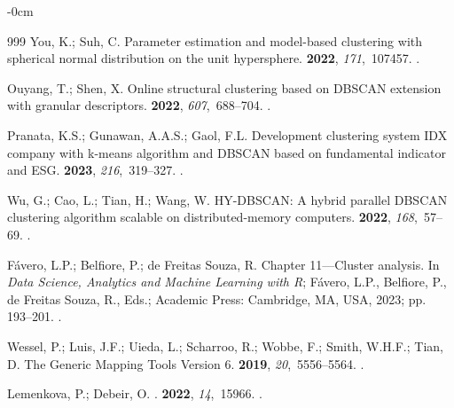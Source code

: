 \documentclass[information,article,accept,pdftex,moreauthors]{Definitions/mdpi}
\begin{document}
\begin{adjustwidth}{-\extralength}{0cm}
\begin{thebibliography}{999}
You, K.; Suh, C.
\newblock Parameter estimation and model-based clustering with spherical normal
  distribution on the unit hypersphere.
 {\bf 2022}, {\em
  171},~107457.
.

Ouyang, T.; Shen, X.
\newblock Online structural clustering based on DBSCAN extension with granular
  descriptors.
 {\bf 2022}, {\em 607},~688--704.
.

Pranata, K.S.; Gunawan, A.A.S.; Gaol, F.L.
\newblock Development clustering system IDX company with k-means algorithm and
  DBSCAN based on fundamental indicator and ESG.
 {\bf 2023}, {\em 216},~319--327.
.

Wu, G.; Cao, L.; Tian, H.; Wang, W.
\newblock HY-DBSCAN: A hybrid parallel DBSCAN clustering algorithm scalable on
  distributed-memory computers.
 {\bf 2022}, {\em
  168},~57--69.
.

Fávero, L.P.; Belfiore, P.; {de Freitas Souza}, R.
\newblock Chapter 11---Cluster analysis. In {\em Data Science, Analytics and
  Machine Learning with R}; Fávero, L.P.,  Belfiore, P.,  {de Freitas Souza},
  R., Eds.; Academic Press: Cambridge, MA, USA, %
  2023; pp. 193--201.
.

Wessel, P.; Luis, J.F.; Uieda, L.; Scharroo, R.; Wobbe, F.; Smith, W.H.F.;
  Tian, D.
\newblock The Generic Mapping Tools Version 6.
 {\bf 2019}, {\em
  20},~5556--5564.
.

Lemenkova, P.; Debeir, O.
.
 {\bf 2022}, {\em 14},~15966.
.


\end{thebibliography}
\end{adjustwidth}
\end{document}
